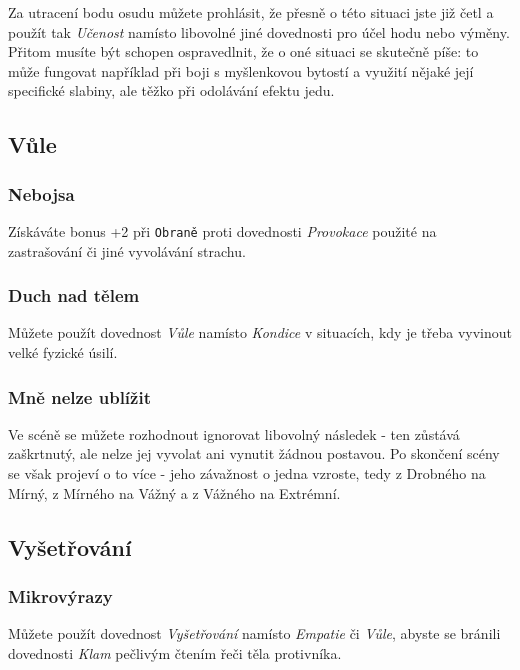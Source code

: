 Za utracení bodu osudu můžete prohlásit, že přesně o této situaci jste již četl a použít tak \textit{Učenost} namísto libovolné jiné dovednosti pro účel hodu nebo výměny. Přitom musíte být schopen ospravedlnit, že o oné situaci se skutečně píše: to může fungovat například při boji s myšlenkovou bytostí a využití nějaké její specifické slabiny, ale těžko při odolávání efektu jedu.

\subsection{Vůle}
\label{sec:trik-vule}

\subsubsection{Nebojsa}
\label{sec:vule-nebojsa}

Získáváte bonus +2 při \texttt{Obraně} proti dovednosti \textit{Provokace} použité na zastrašování či jiné vyvolávání strachu.

\subsubsection{Duch nad tělem}
\label{sec:vule-duch}

Můžete použít dovednost \textit{Vůle} namísto \textit{Kondice} v situacích, kdy je třeba vyvinout velké fyzické úsilí.

\subsubsection{Mně nelze ublížit}
\label{sec:vule-ublizit}

Ve scéně se můžete rozhodnout ignorovat libovolný následek - ten zůstává zaškrtnutý, ale nelze jej vyvolat ani vynutit žádnou postavou. Po skončení scény se však projeví o to více - jeho závažnost o jedna vzroste, tedy z Drobného na Mírný, z Mírného na Vážný a z Vážného na Extrémní.


\subsection{Vyšetřování}
\label{sec:trik-vysetrovani}

\subsubsection{Mikrovýrazy}
\label{sec:vysetrovani-mikro}

Můžete použít dovednost \textit{Vyšetřování} namísto \textit{Empatie} či \textit{Vůle}, abyste se bránili dovednosti \textit{Klam} pečlivým čtením řeči těla protivníka.

